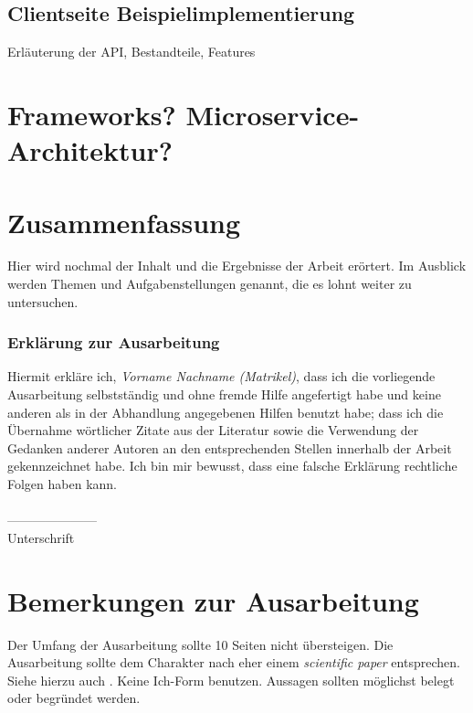 \documentclass[fleqn,10pt,ngerman]{SelfArx}
\begin{document}
\subsection{Clientseite Beispielimplementierung}
Erläuterung der API, Bestandteile, Features 

\section{Frameworks? Microservice-Architektur?}

\section{Zusammenfassung}
Hier wird nochmal der Inhalt und die Ergebnisse der Arbeit erörtert. Im Ausblick werden Themen und Aufgabenstellungen genannt, die es lohnt weiter zu untersuchen.






\subsubsection*{Erklärung zur Ausarbeitung}
Hiermit erkläre ich, {\it Vorname Nachname (Matrikel)}, dass ich die vorliegende Ausarbeitung selbstständig und ohne fremde Hilfe angefertigt habe und keine anderen als in der Abhandlung angegebenen Hilfen benutzt habe; dass ich die Übernahme wörtlicher Zitate aus der Literatur sowie die Verwendung der Gedanken anderer Autoren an den entsprechenden Stellen innerhalb der Arbeit gekennzeichnet habe. Ich bin mir bewusst, dass eine falsche Erklärung rechtliche Folgen haben kann.\\ \\
--------------------- \\
Unterschrift


\clearpage
\newpage
\appendix
\section{Bemerkungen zur Ausarbeitung}
Der Umfang der Ausarbeitung sollte 10 Seiten nicht übersteigen. Die Ausarbeitung sollte dem Charakter nach eher einem {\it scientific paper} entsprechen. Siehe hierzu auch  \cite{Rechenberg}. Keine Ich-Form benutzen. Aussagen sollten möglichst belegt oder begründet werden.
\end{document}

